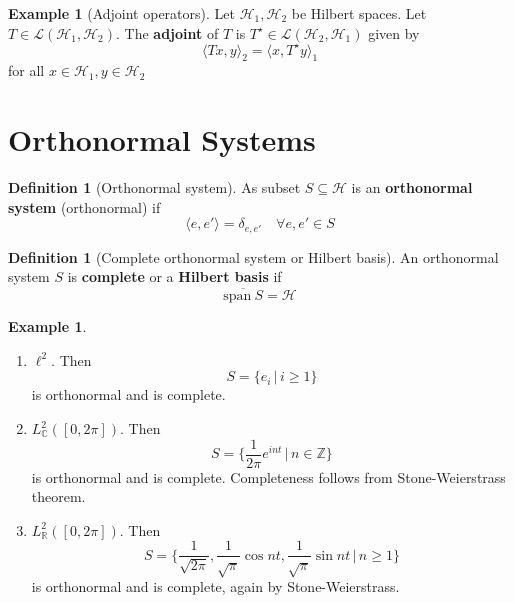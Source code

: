 \documentclass[justified]{tufte-book}
\theoremstyle{plain}%
\theoremstyle{definition}
\newtheorem{defn}[thm]{Definition}
\newtheorem{exmp}[thm]{Example}
\newtheorem{exer}[thm]{Exercise}
\theoremstyle{remark}
\newcommand{\R}{\mathbb{R}}
\renewcommand{\H}{\mathcal{H}}
\renewcommand{\C}{\mathbb{C}}
\newcommand{\Z}{\mathbb{Z}}
\newcommand{\spans}{\text{span}\ }
\begin{document}
\begin{exmp}[Adjoint operators]
  Let $\H_1, \H_2$ be Hilbert spaces.  Let $ T \in \mathcal{L}(\H_1, \H_2)$.  The \textbf{adjoint} of $T$ is $T^\star \in \mathcal{L}(\H_2, \H_1)$ given by \[
      \langle T x, y \rangle_2 = \langle x, T^\star y \rangle_1
  \] for all $x \in \H_1, y \in \H_2$
\end{exmp}
% 

% 

\section{Orthonormal Systems} %
\label{sec:orthonormal_systems}

\begin{defn}[Orthonormal system]
  As subset $S \subseteq \H$ is an \textbf{orthonormal system} (orthonormal) if \[
      \langle e, e' \rangle = \delta_{e, e'} \quad \forall e, e' \in S
  \]
\end{defn}

\begin{defn}[Complete orthonormal system or Hilbert basis]
  An orthonormal system $S$ is \textbf{complete} or a \textbf{Hilbert basis}  
   if \[
      \overline{\spans S} = \H
  \]
\end{defn}


\begin{exmp}{\ }
  \begin{enumerate}
      \item $\ell^2$.  Then \[
          S = \{ e_i \, | \, i \geq 1 \}
      \] is orthonormal and is complete.  
      \item $L^2_\C([0, 2 \pi])$.  Then \[
          S = \{ \frac{1}{2\pi} e^{i n t} \, | \, n \in \Z \}
      \] is orthonormal and is complete.  Completeness follows from Stone-Weierstrass theorem.
      \item $L^2_\R([0, 2 \pi])$.  Then \[
          S= \{ \frac{1}{\sqrt{2\pi}}, \frac{1}{\sqrt{\pi}} \cos nt, \frac{1}{\sqrt{\pi}} \sin nt \, | \, n \geq 1 \}
      \] is orthonormal and is complete, again by Stone-Weierstrass.  
  \end{enumerate}
\end{exmp}
\end{document}
